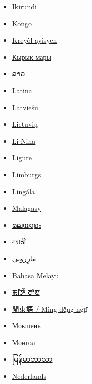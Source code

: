 \documentclass[11pt,a4paper]{article}
\begin{document}
\begin{itemize}
\item \href{https://rn.wikipedia.org/wiki/Imbata}{Ikirundi}
\item \href{https://kg.wikipedia.org/wiki/Kivadangu}{Kongo}
\item \href{https://ht.wikipedia.org/wiki/Kanna}{Kreyòl ayisyen}
\item \href{https://mrj.wikipedia.org/wiki/\%D0\%9B\%D1\%8B\%D0\%B4\%D1\%8B\%D0\%B2\%D0\%BB\%D3\%93}{Кырык мары}
\item \href{https://lo.wikipedia.org/wiki/\%E0\%BB\%80\%E0\%BA\%9B\%E0\%BA\%B1\%E0\%BA\%94}{ລາວ}
\item \href{https://la.wikipedia.org/wiki/Anas\_(avis)}{Latina}
\item \href{https://lv.wikipedia.org/wiki/P\%C4\%ABle}{Latviešu}
\item \href{https://lt.wikipedia.org/wiki/Antis}{Lietuvių}
\item \href{https://nia.wikipedia.org/wiki/Bebe}{Li Niha}
\item \href{https://lij.wikipedia.org/wiki/Annia}{Ligure}
\item \href{https://li.wikipedia.org/wiki/Aenj}{Limburgs}
\item \href{https://ln.wikipedia.org/wiki/Libat\%C3\%A1}{Lingála}
\item \href{https://mg.wikipedia.org/wiki/Ganagana}{Malagasy}
\item \href{https://ml.wikipedia.org/wiki/\%E0\%B4\%A4\%E0\%B4\%BE\%E0\%B4\%B1\%E0\%B4\%BE\%E0\%B4\%B5\%E0\%B5\%8D}{മലയാളം}
\item \href{https://mr.wikipedia.org/wiki/\%E0\%A4\%AC\%E0\%A4\%A6\%E0\%A4\%95}{मराठी}
\item \href{https://mzn.wikipedia.org/wiki/\%D8\%B3\%DB\%8C\%DA\%A9\%D8\%A7}{مازِرونی}
\item \href{https://ms.wikipedia.org/wiki/Itik}{Bahasa Melayu}
\item \href{https://mni.wikipedia.org/wiki/\%EA\%AF\%89\%EA\%AF\%A5\%EA\%AF\%85\%EA\%AF\%A8}{ꯃꯤꯇꯩ ꯂꯣꯟ}
\item \href{https://cdo.wikipedia.org/wiki/\%C3\%81k}{閩東語 / Mìng-dĕ̤ng-ngṳ̄}
\item \href{https://mdf.wikipedia.org/wiki/\%D0\%AF\%D0\%BA\%D1\%81\%D1\%8F\%D1\%80\%D0\%B3\%D0\%B0}{Мокшень}
\item \href{https://mn.wikipedia.org/wiki/\%D0\%9D\%D1\%83\%D0\%B3\%D0\%B0\%D1\%81}{Монгол}
\item \href{https://my.wikipedia.org/wiki/\%E1\%80\%98\%E1\%80\%B2}{မြန်မာဘာသာ}
\item \href{https://nl.wikipedia.org/wiki/Eenden}{Nederlands}

\end{itemize}
\end{document}
